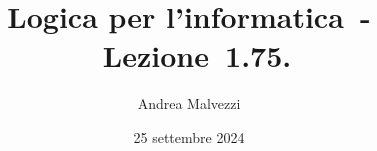 \documentclass[12pt]{article}
\title{\textbf{Logica per l'informatica~-~Lezione~1.75.\\}}
\date{25 settembre 2024}
\author{Andrea Malvezzi}
\begin{document}
\maketitle
\pagebreak
\end{document}
